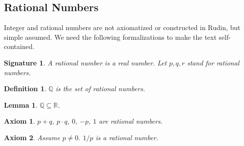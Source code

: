 \documentclass{article}
\newenvironment{forthel}{\begin{leftbar}}{\end{leftbar}}
\newtheorem{axiom}{Axiom}
\newtheorem{lemma}{Lemma}
\newtheorem{definition}{Definition}
\newtheorem{signature}{Signature}
\newcommand{\RR}{\mathbb{R}}
\newcommand{\QQ}{\mathbb{Q}}
\begin{document}
\subsection{Rational Numbers}
Integer and rational numbers are not axiomatized or constructed in Rudin, but simple assumed. We need the following formalizations to make the text self-contained.

\begin{forthel}

\begin{signature} A \emph{rational number} is a real number.
Let $p,q,r$ stand for rational numbers.\end{signature}

\begin{definition} $\QQ$ is the set of rational numbers.
\end{definition}


\begin{lemma} $\QQ \subseteq \RR$.\end{lemma}

\begin{axiom} $p + q$, $p \cdot q$, $0$, $-p$, $1$ are 
rational numbers.\end{axiom}

\begin{axiom} Assume $p \neq 0$. $1/p$ is a rational number.
\end{axiom}

\end{forthel}
\end{document}
